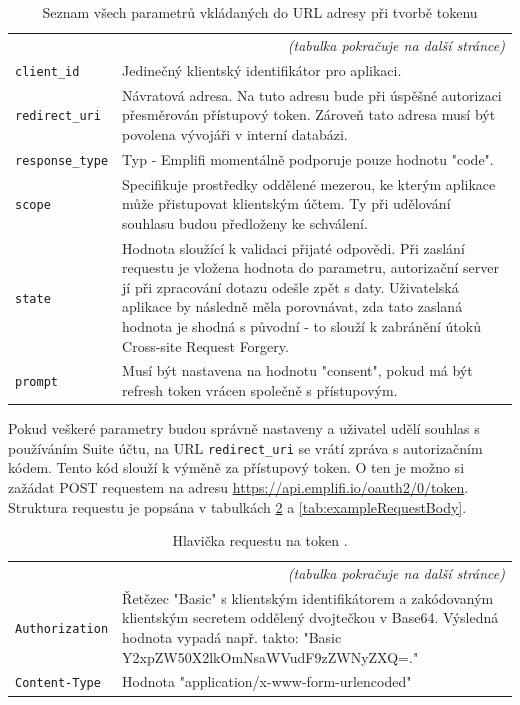 \documentclass[czech, bc, kiv, he, iso690numb]{fasthesis}
\begin{document}
\begin{center}
	\begin{longtable}{p{}p{}}
	\caption{Seznam všech parametrů vkládaných do URL adresy při tvorbě tokenu \cite{emplifiDocs}}
	\label{tab:allParametersAPI}\\
	\toprule[1.5pt]
	\endhead
	\midrule
	\multicolumn{2}{r}{\textit{(tabulka pokračuje na další stránce)}}\\
	\endfoot
	\bottomrule[1.5pt]
	\endlastfoot
	\verb"client_id" &  Jedinečný klientský identifikátor pro aplikaci.\\
	\midrule
	\verb"redirect_uri" & Návratová adresa. Na tuto adresu bude při úspěšné autorizaci přesměrován přístupový token. Zároveň tato adresa musí být povolena vývojáři v interní databázi.\\
	\midrule
	\verb"response_type" & Typ - Emplifi momentálně podporuje pouze hodnotu "code".\\
	\midrule
	\verb"scope" & Specifikuje prostředky oddělené mezerou, ke kterým aplikace může přistupovat klientským účtem. Ty při udělování souhlasu budou předloženy ke schválení. \\
	\midrule
	\verb"state" & Hodnota sloužící k validaci přijaté odpovědi. Při zaslání requestu je vložena hodnota do parametru, autorizační server jí při zpracování dotazu odešle zpět s daty. Uživatelská aplikace by následně měla porovnávat, zda tato zaslaná hodnota je shodná s původní - to slouží k zabránění útoků Cross-site Request Forgery.\\
	\midrule
	\verb"prompt" & Musí být nastavena na hodnotu "consent", pokud má být refresh token vrácen společně s přístupovým.\\
	\end{longtable}
\end{center}


Pokud veškeré parametry budou správně nastaveny a uživatel udělí souhlas s používáním Suite účtu, na URL \texttt{redirect\_uri} se vrátí zpráva s autorizačním kódem. Tento kód
slouží k výměně za přístupový token. O ten je možno si zažádat POST requestem na adresu \url{https://api.emplifi.io/oauth2/0/token}. Struktura requestu je popsána v tabulkách \ref{tab:exampleRequestHeader} a \ref{tab:exampleRequestBody}.

\begin{center}
	\begin{longtable}{p{}p{}}
	\caption{Hlavička requestu na token \cite{emplifiDocs}.}
	\label{tab:exampleRequestHeader}\\
	\toprule[1.5pt]
	\endhead
	\midrule
	\multicolumn{2}{r}{\textit{(tabulka pokračuje na další stránce)}}\\
	\endfoot
	\bottomrule[1.5pt]
	\endlastfoot
	\verb"Authorization" & Řetězec "Basic" s klientským identifikátorem a zakódovaným klientským secretem oddělený dvojtečkou v Base64. Výsledná hodnota vypadá např. takto: "Basic Y2xpZW50X2lkOmNsaWVudF9zZWNyZXQ=."\\
	\midrule
	\verb"Content-Type" & Hodnota "application/x-www-form-urlencoded" \\
	\end{longtable}
\end{center}
\end{document}
